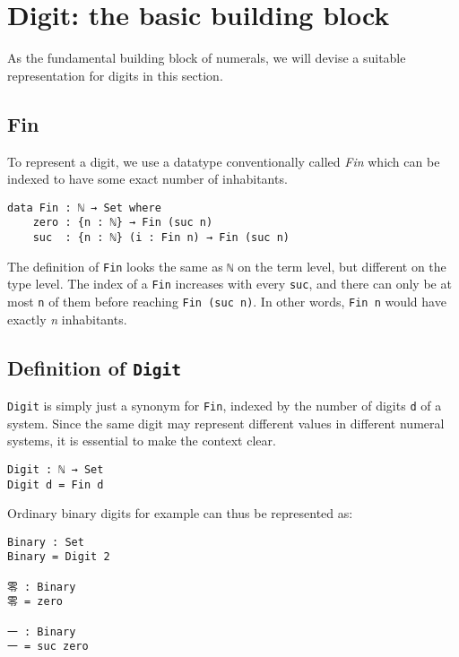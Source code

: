 \documentclass[\main/thesis.tex]{subfiles}
\begin{document}
\section{Digit: the basic building block}\label{digit}

As the fundamental building block of numerals, we will devise a suitable
representation for digits in this section.

\subsection{Fin}

To represent a digit, we use a datatype conventionally called \textit{Fin}
which can be indexed to have some exact number of inhabitants.

\begin{lstlisting}
data Fin : ℕ → Set where
    zero : {n : ℕ} → Fin (suc n)
    suc  : {n : ℕ} (i : Fin n) → Fin (suc n)
\end{lstlisting}

The definition of {\lstinline|Fin|} looks the same as {\lstinline|ℕ|} on the term
level, but different on the type level. The index of a {\lstinline|Fin|} increases
with every {\lstinline|suc|}, and there can only be at most {\lstinline|n|} of
them before reaching {\lstinline|Fin (suc n)|}. In other words, {\lstinline|Fin n|}
would have exactly \textit{n} inhabitants.

\subsection{Definition of \lstinline|Digit|}

{\lstinline|Digit|} is simply just a synonym for {\lstinline|Fin|}, indexed by
the number of digits {\lstinline|d|} of a system.
Since the same digit may represent different values in different numeral systems,
it is essential to make the context clear.

\begin{lstlisting}
Digit : ℕ → Set
Digit d = Fin d
\end{lstlisting}

Ordinary binary digits for example can thus be represented as:

\begin{lstlisting}
Binary : Set
Binary = Digit 2

零 : Binary
零 = zero

一 : Binary
一 = suc zero
\end{lstlisting}
\end{document}
